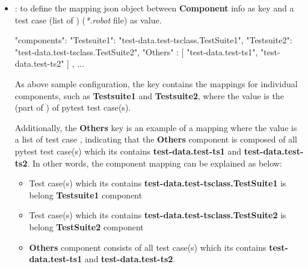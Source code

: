 \begin{itemize}
\begin{itemize}
\begin{itemize}
                      for all test casea within this execution.
\begin{robotcode}
{
  "components" : "atest",
  ...
}
\end{robotcode}
                \item {}: to define the mapping json object between
                      \textbf{Component} info as key and a test case
                       (list of )
                      (\emph{*.robot} file) as value.
\begin{robotcode}
{
  "components": {
    "Testsuite1": "test-data.test-tsclass.TestSuite1",
    "Testsuite2": "test-data.test-tsclass.TestSuite2",
    "Others"    : [
        "test-data.test-ts1",
        "test-data.test-ts2"
    ]
  },
  ...
}
\end{robotcode}
                As above sample configuration, the  key
                contains the mappings for individual components, such as
                \textbf{Testsuite1} and \textbf{Testsuite2}, where the value
                is the  (part of ) of pytest
                test case(s).

                Additionally, the \textbf{Others} key is an example of a mapping
                where the value is a list of test case ,
                indicating that the \textbf{Others} component is composed of all
                pytest test case(s) which its  contains
                \textbf{test-data.test-ts1} and \textbf{test-data.test-ts2}.
                \newline
                In other words, the component mapping can be explained as below:
                \begin{itemize}
                  \item Test case(s) which its  contains
                        \textbf{test-data.test-tsclass.TestSuite1} is belong
                        \textbf{Testsuite1} component
                  \item Test case(s) which its  contains
                        \textbf{test-data.test-tsclass.TestSuite2} is belong
                        \textbf{TestSuite2} component
                  \item \textbf{Others} component consists of all test case(s)
                        which its  contains \textbf{test-data.test-ts1}
                        and \textbf{test-data.test-ts2}.
                \end{itemize}


\end{itemize}
\end{itemize}
\end{itemize}
